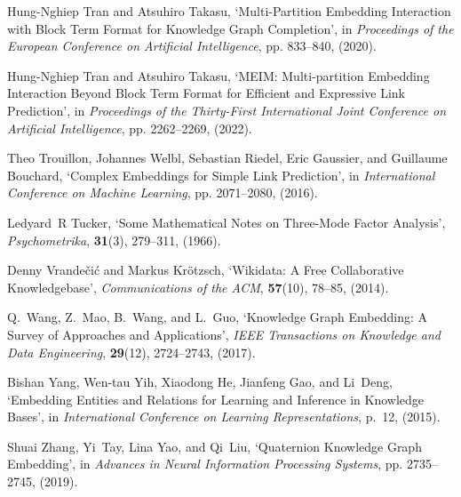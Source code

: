 \documentclass{ecai}
\theoremstyle{plain}  \newtheorem{thm}{Theorem}  \newtheorem{lem}[thm]{Lemma}  \newtheorem{prop}[thm]{Proposition}
\theoremstyle{remark}  \newtheorem*{rem}{Remark}
\begin{document}
\begin{thebibliography}{10}
Hung-Nghiep Tran and Atsuhiro Takasu, `Multi-{{Partition Embedding
  Interaction}} with {{Block Term Format}} for {{Knowledge Graph Completion}}',
  in {\em Proceedings of the {{European Conference}} on {{Artificial
  Intelligence}}}, pp. 833--840, (2020).

Hung-Nghiep Tran and Atsuhiro Takasu, `{{MEIM}}: {{Multi-partition Embedding
  Interaction Beyond Block Term Format}} for {{Efficient}} and {{Expressive
  Link Prediction}}', in {\em Proceedings of the {{Thirty-First International
  Joint Conference}} on {{Artificial Intelligence}}}, pp. 2262--2269, (2022).

Theo Trouillon, Johannes Welbl, Sebastian Riedel, {Eric Gaussier}, and
  {Guillaume Bouchard}, `Complex {{Embeddings}} for {{Simple Link
  Prediction}}', in {\em International {{Conference}} on {{Machine Learning}}},
  pp. 2071--2080, (2016).

Ledyard~R Tucker, `Some {{Mathematical Notes}} on {{Three-Mode Factor
  Analysis}}', {\em Psychometrika}, {\bf 31}(3),  279--311, (1966).

Denny Vrande{\v c}i{\'c} and Markus Kr{\"o}tzsch, `Wikidata: A {{Free
  Collaborative Knowledgebase}}', {\em Communications of the ACM}, {\bf
  57}(10),  78--85, (2014).

Q.~Wang, Z.~Mao, B.~Wang, and L.~Guo, `Knowledge {{Graph Embedding}}: {{A
  Survey}} of {{Approaches}} and {{Applications}}', {\em IEEE Transactions on
  Knowledge and Data Engineering}, {\bf 29}(12),  2724--2743, (2017).

Bishan Yang, Wen-tau Yih, Xiaodong He, Jianfeng Gao, and Li~Deng, `Embedding
  {{Entities}} and {{Relations}} for {{Learning}} and {{Inference}} in
  {{Knowledge Bases}}', in {\em International {{Conference}} on {{Learning
  Representations}}}, p.~12, (2015).

Shuai Zhang, Yi~Tay, Lina Yao, and Qi~Liu, `Quaternion {{Knowledge Graph
  Embedding}}', in {\em Advances in {{Neural Information Processing Systems}}},
  pp. 2735--2745, (2019).

\end{thebibliography}
 
\end{document}
